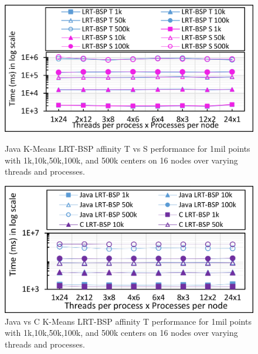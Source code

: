 \documentclass[10pt, conference, compsocconf]{IEEEtran}
\begin{document}
\begin{figure}[!htb]
    \begin{minipage}{0.49\textwidth}
        \centering
        \includegraphics[width=1\columnwidth]{images/fig_kmeans_1mil_varying_centers_BSP_T_vs_BSP_S_Java}
		\caption{Java K-Means \ac{LRT-BSP} affinity T vs S performance for 1mil points with 1k,10k,50k,100k, and 500k centers on 16 nodes over varying threads and processes.}
		\label{fig:images/fig_kmeans_1mil_varying_centers_BSP_T_C_vs_Java}
    \end{minipage}
    \hspace{1.4mm}
    \begin{minipage}{0.49\textwidth}
        \centering
        \includegraphics[width=1\columnwidth]{images/fig_kmeans_1mil_varying_centers_BSP_T_C_vs_Java}
		\caption{Java vs C K-Means \ac{LRT-BSP} affinity T performance for 1mil points with 1k,10k,50k,100k, and 500k centers on 16 nodes over varying threads and processes.}
		\label{fig:images/fig_kmeans_1mil_varying_centers_BSP_T_C_vs_Java}
    \end{minipage}   
\end{figure}
\end{document}
